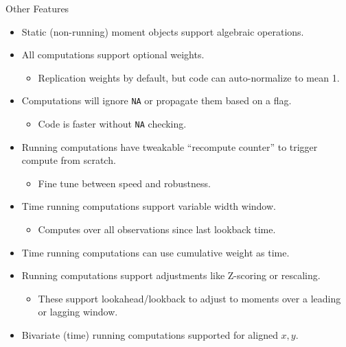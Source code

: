 \documentclass[
  24pt,
  ignorenonframetext,
  aspectratio=43,
]{beamer}
\providecommand{\tightlist}{%
  \setlength{\itemsep}{0pt}\setlength{\parskip}{0pt}}\usepackage{longtable,booktabs,array}
\begin{document}
\begin{frame}[fragile]{Other Features}
\label{other-features}
\begin{itemize}
\tightlist
\item
  Static (non-running) moment objects support algebraic operations.
\item
  All computations support optional weights.

  \begin{itemize}
  \tightlist
  \item
    Replication weights by default, but code can auto-normalize to mean
    1.
  \end{itemize}
\item
  Computations will ignore \texttt{NA} or propagate them based on a
  flag.

  \begin{itemize}
  \tightlist
  \item
    Code is faster without \texttt{NA} checking.
  \end{itemize}
\item
  Running computations have tweakable ``recompute counter'' to trigger
  compute from scratch.

  \begin{itemize}
  \tightlist
  \item
    Fine tune between speed and robustness.
  \end{itemize}
\item
  Time running computations support variable width window.

  \begin{itemize}
  \tightlist
  \item
    Computes over all observations since last lookback time.
  \end{itemize}
\item
  Time running computations can use cumulative weight as time.
\item
  Running computations support adjustments like Z-scoring or rescaling.

  \begin{itemize}
  \tightlist
  \item
    These support lookahead/lookback to adjust to moments over a leading
    or lagging window.
  \end{itemize}
\item
  Bivariate (time) running computations supported for aligned \(x, y\).
\end{itemize}
\end{frame}
\end{document}
